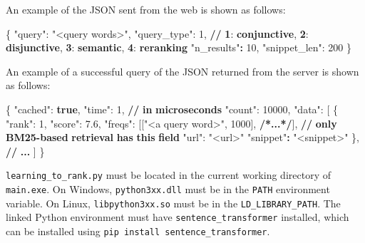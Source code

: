 \documentclass[11pt]{article}
\newenvironment{Shaded}{}{}
\newcommand{\DataTypeTok}[1]{\textcolor[rgb]{0.56,0.13,0.00}{#1}}
\newcommand{\DecValTok}[1]{\textcolor[rgb]{0.25,0.63,0.44}{#1}}
\newcommand{\ErrorTok}[1]{\textcolor[rgb]{1.00,0.00,0.00}{\textbf{#1}}}
\newcommand{\FloatTok}[1]{\textcolor[rgb]{0.25,0.63,0.44}{#1}}
\newcommand{\FunctionTok}[1]{\textcolor[rgb]{0.02,0.16,0.49}{#1}}
\newcommand{\KeywordTok}[1]{\textcolor[rgb]{0.00,0.44,0.13}{\textbf{#1}}}
\newcommand{\OtherTok}[1]{\textcolor[rgb]{0.00,0.44,0.13}{#1}}
\newcommand{\StringTok}[1]{\textcolor[rgb]{0.25,0.44,0.63}{#1}}
\begin{document}
An example of the JSON sent from the web is shown as follows:

\begin{Shaded}
\begin{Highlighting}[]
\FunctionTok{\{}
    \DataTypeTok{"query"}\FunctionTok{:} \StringTok{"\textless{}query words\textgreater{}"}\FunctionTok{,}
    \DataTypeTok{"query\_type"}\FunctionTok{:} \DecValTok{1}\FunctionTok{,}
    \ErrorTok{//} \ErrorTok{1}\FunctionTok{:} \ErrorTok{conjunctive}\FunctionTok{,} \ErrorTok{2}\FunctionTok{:} \ErrorTok{disjunctive}\FunctionTok{,} \ErrorTok{3}\FunctionTok{:} \ErrorTok{semantic}\FunctionTok{,} \ErrorTok{4}\FunctionTok{:} \ErrorTok{reranking}
    \StringTok{"n\_results"}\ErrorTok{:} \DecValTok{10}\FunctionTok{,}
    \DataTypeTok{"snippet\_len"}\FunctionTok{:} \DecValTok{200}
\FunctionTok{\}}
\end{Highlighting}
\end{Shaded}

An example of a successful query of the JSON returned from the server is
shown as follows:

\begin{Shaded}
\begin{Highlighting}[]
\FunctionTok{\{}
    \DataTypeTok{"cached"}\FunctionTok{:} \KeywordTok{true}\FunctionTok{,}
    \DataTypeTok{"time"}\FunctionTok{:} \DecValTok{1}\FunctionTok{,} \ErrorTok{//} \ErrorTok{in} \ErrorTok{microseconds}
    \DataTypeTok{"count"}\FunctionTok{:} \DecValTok{10000}\FunctionTok{,}
    \DataTypeTok{"data"}\FunctionTok{:} \OtherTok{[}
    \FunctionTok{\{}
        \DataTypeTok{"rank"}\FunctionTok{:} \DecValTok{1}\FunctionTok{,}
        \DataTypeTok{"score"}\FunctionTok{:} \FloatTok{7.6}\FunctionTok{,}
        \DataTypeTok{"freqs"}\FunctionTok{:} \OtherTok{[[}\StringTok{"\textless{}a query word\textgreater{}"}\OtherTok{,} \DecValTok{1000}\OtherTok{],} \ErrorTok{/*...*/}\OtherTok{]}\FunctionTok{,}
        \ErrorTok{//} \ErrorTok{only} \ErrorTok{BM25{-}based} \ErrorTok{retrieval} \ErrorTok{has} \ErrorTok{this} \ErrorTok{field}
        \DataTypeTok{"url"}\FunctionTok{:} \StringTok{"\textless{}url\textgreater{}"}
        \StringTok{"snippet"}\ErrorTok{:} \StringTok{"\textless{}snippet\textgreater{}"}
    \FunctionTok{\}}\OtherTok{,} \ErrorTok{//} \ErrorTok{...}
    \OtherTok{]}
\FunctionTok{\}}
\end{Highlighting}
\end{Shaded}

\texttt{learning\_to\_rank.py} must be located in the current working
directory of \texttt{main.exe}. On Windows, \texttt{python3xx.dll} must
be in the \texttt{PATH} environment variable. On Linux,
\texttt{libpython3xx.so} must be in the \texttt{LD\_LIBRARY\_PATH}. The
linked Python environment must have \texttt{sentence\_transformer}
installed, which can be installed using
\texttt{pip\ install\ sentence\_transformer}.
\end{document}
